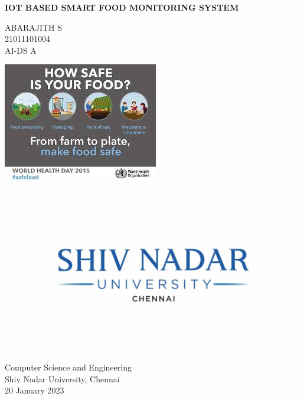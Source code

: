 \begin{titlepage}
    \centering
        \vspace*{2cm}
        \Huge
        \textbf{IOT BASED SMART FOOD MONITORING SYSTEM}
        
        \vspace*{0.6cm}
        \Large
        \textit{}
        
        \normalsize
        \vspace*{1.5cm}
        ABARAJITH S\\
        \vspace{0.2cm}
        21011101004\\
        \vspace{0.2cm}
        AI-DS A\\
        
        \vfill     
        
        \includegraphics{images/titleimg.jpeg}\\
        
        \vfill
        
        \includegraphics{images/logo.jpg}\\
        Computer Science and Engineering\\
        Shiv Nadar University, Chennai\\
        20 January 2023
        \vspace*{1cm}
    
\end{titlepage}
